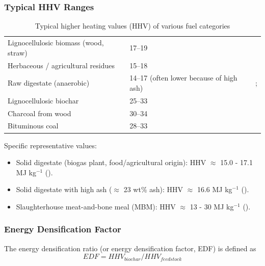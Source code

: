 \subsubsection*{Typical HHV Ranges}
\begin{table}[H]
\centering
\caption{Typical higher heating values (HHV) of various fuel categories}
\label{tab:hhv_fuels}
\begin{tabular}{L{3.5cm} L{4cm} L{4.5cm}}
\toprule
{} &  &  \\
\midrule
Lignocellulosic biomass (wood, straw) & 17--19 & \textcite{van-loo-2008} \\ \addlinespace
Herbaceous / agricultural residues & 15--18 & \textcite{vassilev-2009} \\ \addlinespace
Raw digestate (anaerobic) & 14--17 (often lower because of high ash) & \textcite{neumann-2014}; \textcite{pecchi-2019} \\ \addlinespace
Lignocellulosic biochar & 25--33 & \textcite{Lehmann2015} \\ \addlinespace
Charcoal from wood & 30--34 & \textcite{antal-2003} \\ \addlinespace
Bituminous coal & 28--33 & \textcite{channiwala-2002} \\
\bottomrule
\end{tabular}
\end{table}

Specific representative values:
\begin{itemize}
    \item Solid digestate (biogas plant, food/agricultural origin): HHV $\approx$ 15.0 - 17.1 MJ kg$^{-1}$ (\textcite{neumann-2014}).
    
    \item Solid digestate with high ash ($\approx$ 23 wt\% ash): HHV $\approx$ 16.6 MJ kg$^{-1}$ (\textcite{hung-2017}).
    
    \item Slaughterhouse meat-and-bone meal (MBM): HHV $\approx$ 13 - 30 MJ kg$^{-1}$ (\textcite{cascarosa-2011}).
\end{itemize}

\subsubsection*{Energy Densification Factor}
The energy densification ratio (or energy densification factor, EDF) is defined as
\begin{equation}\label{eq:edf}
    EDF = HHV_{biochar} / HHV_{feedstock}  
\end{equation}
             
